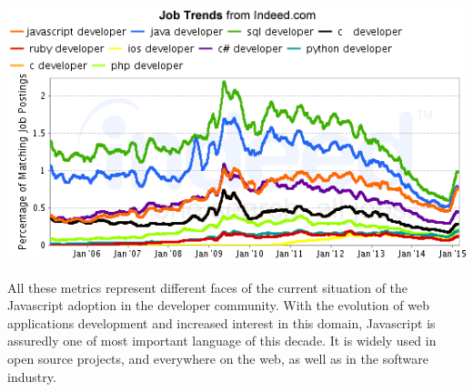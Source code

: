 \includegraphics[width=0.9\linewidth]{../../data/js-trends/jobgraph}



All these metrics represent different faces of the current situation of the Javascript adoption in the developer community.
With the evolution of web applications development and increased interest in this domain, Javascript is assuredly one of most important language of this decade.
It is widely used in open source projects, and everywhere on the web, as well as in the software industry.